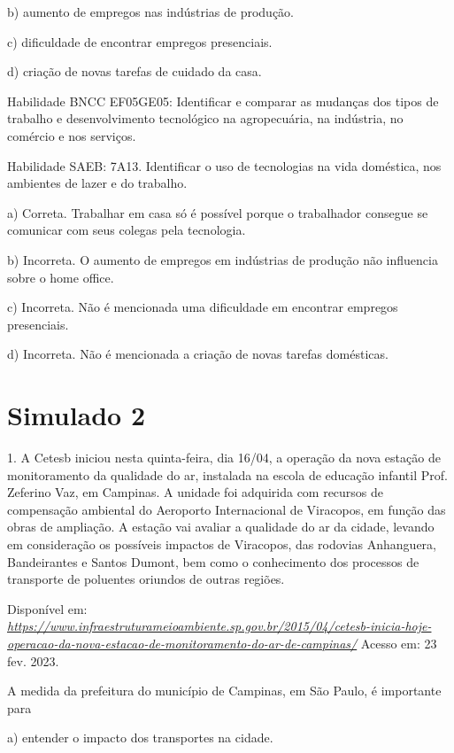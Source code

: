b) aumento de empregos nas indústrias de produção.

c) dificuldade de encontrar empregos presenciais.

d) criação de novas tarefas de cuidado da casa.

Habilidade BNCC EF05GE05: Identificar e comparar as mudanças dos tipos
de trabalho e desenvolvimento tecnológico na agropecuária, na indústria,
no comércio e nos serviços.

Habilidade SAEB: 7A13. Identificar o uso de tecnologias na vida
doméstica, nos ambientes de lazer e do trabalho.

a) Correta. Trabalhar em casa só é possível porque o trabalhador
consegue se comunicar com seus colegas pela tecnologia.

b) Incorreta. O aumento de empregos em indústrias de produção não
influencia sobre o home office.

c) Incorreta. Não é mencionada uma dificuldade em encontrar empregos
presenciais.

d) Incorreta. Não é mencionada a criação de novas tarefas domésticas.

\section{Simulado 2 }\label{simulado-2}

1. A Cetesb iniciou nesta quinta-feira, dia 16/04, a operação da nova
estação de monitoramento da qualidade do ar, instalada na escola de
educação infantil Prof. Zeferino Vaz, em Campinas. A unidade foi
adquirida com recursos de compensação ambiental do Aeroporto
Internacional de Viracopos, em função das obras de ampliação. A estação
vai avaliar a qualidade do ar da cidade, levando em consideração os
possíveis impactos de Viracopos, das rodovias Anhanguera, Bandeirantes e
Santos Dumont, bem como o conhecimento dos processos de transporte de
poluentes oriundos de outras regiões.

Disponível em:
\href{https://www.infraestruturameioambiente.sp.gov.br/2015/04/cetesb-inicia-hoje-operacao-da-nova-estacao-de-monitoramento-do-ar-de-campinas/}{\emph{https://www.infraestruturameioambiente.sp.gov.br/2015/04/cetesb-inicia-hoje-operacao-da-nova-estacao-de-monitoramento-do-ar-de-campinas/}}
Acesso em: 23 fev. 2023.

A medida da prefeitura do município de Campinas, em São Paulo, é
importante para

a) entender o impacto dos transportes na cidade.

